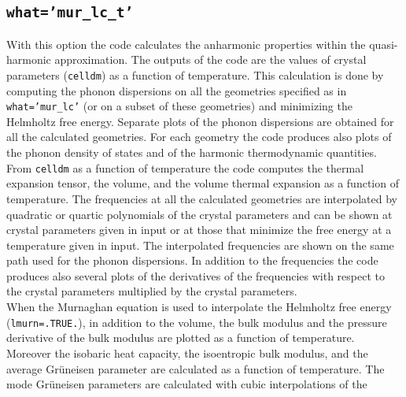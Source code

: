 \documentclass[12pt,a4paper]{article}
\begin{document}

\subsection{\color{web-blue}\texttt{what='mur\_lc\_t'}}
With this option the code calculates the anharmonic 
properties within the quasi-harmonic approximation. 
The outputs of the code are the values of crystal parameters 
(\texttt{celldm}) as a function of temperature. This calculation is done 
by computing the phonon dispersions on all the geometries specified as in
\texttt{what='mur\_lc'} (or on a subset of these geometries) and 
minimizing the Helmholtz free energy.
Separate plots of the phonon dispersions are obtained for all the 
calculated geometries.
For each geometry the code produces also plots of the phonon density
of states and of the harmonic thermodynamic quantities.
From \texttt{celldm} as a function of temperature the code computes the thermal
expansion tensor, the volume, and the volume thermal expansion as a 
function of temperature. 
The frequencies at all the calculated geometries are interpolated
by quadratic or quartic polynomials of the crystal parameters
and can be shown at crystal parameters given in input or at those that
minimize the free energy at a temperature given in input. The 
interpolated frequencies  
are shown on the same path used for the phonon dispersions.
In addition to the frequencies the code produces also several plots of
the derivatives of the frequencies with respect to the crystal parameters
multiplied by the crystal parameters. \\
When the Murnaghan equation is used to interpolate the
Helmholtz free energy (\texttt{lmurn=.TRUE.}), in addition to the volume, 
the bulk modulus and the pressure derivative of the bulk modulus are 
plotted as a function of 
temperature. Moreover the isobaric heat capacity, the isoentropic 
bulk modulus, and the average Gr\"uneisen parameter are calculated as 
a function of temperature.
The mode Gr\"uneisen parameters are calculated with cubic interpolations of the
\end{document}

